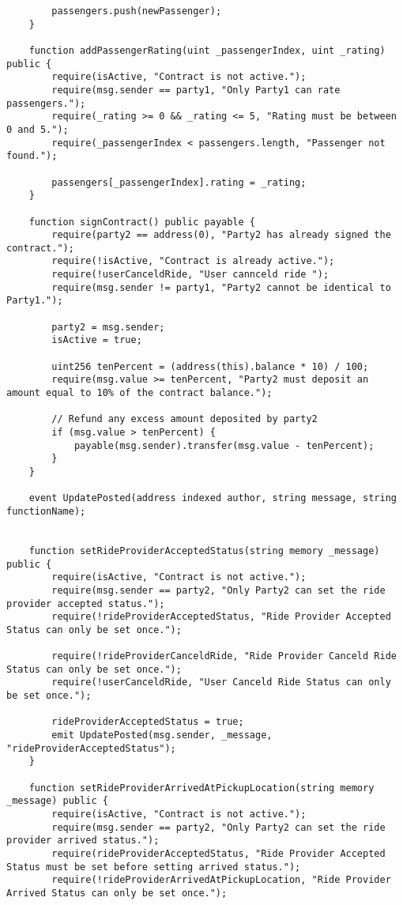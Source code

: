 \begin{lstlisting}
        passengers.push(newPassenger);
    }

    function addPassengerRating(uint _passengerIndex, uint _rating) public {
        require(isActive, "Contract is not active.");
        require(msg.sender == party1, "Only Party1 can rate passengers.");
        require(_rating >= 0 && _rating <= 5, "Rating must be between 0 and 5.");
        require(_passengerIndex < passengers.length, "Passenger not found.");

        passengers[_passengerIndex].rating = _rating;
    }

    function signContract() public payable {
        require(party2 == address(0), "Party2 has already signed the contract.");
        require(!isActive, "Contract is already active.");
        require(!userCanceldRide, "User cannceld ride ");
        require(msg.sender != party1, "Party2 cannot be identical to Party1.");
        
        party2 = msg.sender;
        isActive = true;

        uint256 tenPercent = (address(this).balance * 10) / 100;
        require(msg.value >= tenPercent, "Party2 must deposit an amount equal to 10% of the contract balance.");

        // Refund any excess amount deposited by party2
        if (msg.value > tenPercent) {
            payable(msg.sender).transfer(msg.value - tenPercent);
        }
    }

    event UpdatePosted(address indexed author, string message, string functionName);


    function setRideProviderAcceptedStatus(string memory _message) public {
        require(isActive, "Contract is not active.");
        require(msg.sender == party2, "Only Party2 can set the ride provider accepted status.");
        require(!rideProviderAcceptedStatus, "Ride Provider Accepted Status can only be set once.");

        require(!rideProviderCanceldRide, "Ride Provider Canceld Ride Status can only be set once.");
        require(!userCanceldRide, "User Canceld Ride Status can only be set once.");

        rideProviderAcceptedStatus = true;
        emit UpdatePosted(msg.sender, _message, "rideProviderAcceptedStatus");
    }

    function setRideProviderArrivedAtPickupLocation(string memory _message) public {
        require(isActive, "Contract is not active.");
        require(msg.sender == party2, "Only Party2 can set the ride provider arrived status.");
        require(rideProviderAcceptedStatus, "Ride Provider Accepted Status must be set before setting arrived status.");
        require(!rideProviderArrivedAtPickupLocation, "Ride Provider Arrived Status can only be set once.");


\end{lstlisting}
